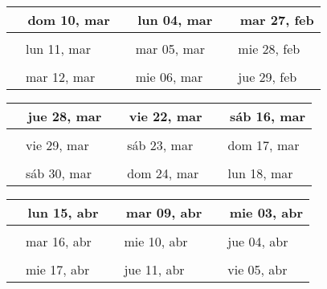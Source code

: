\documentclass[letterpaper,10pt]{article}
\begin{document}
\begin{tabular}{lll}
\\
{\ \ dom 10, mar\hspace{4.5cm}\vspace{2.25cm}} &{\ \ lun 04, mar\hspace{4.5cm}} &{\ \ mar 27, feb\hspace{4.5cm}}
\\ \hline \\
{\ \ lun 11, mar\vspace{2.25cm}} & {\ \ mar 05, mar} & {\ \ mie 28, feb}
\\ \hline \\
{\ \ mar 12, mar\vspace{2.25cm}} & {\ \ mie 06, mar} & {\ \ jue 29, feb}
\\
\end{tabular}\par
\begin{tabular}{lll}
\\
{\ \ jue 28, mar\hspace{4.5cm}\vspace{2.25cm}} &{\ \ vie 22, mar\hspace{4.5cm}} &{\ \ sáb 16, mar\hspace{4.5cm}}
\\ \hline \\
{\ \ vie 29, mar\vspace{2.25cm}} & {\ \ sáb 23, mar} & {\ \ dom 17, mar}
\\ \hline \\
{\ \ sáb 30, mar\vspace{2.25cm}} & {\ \ dom 24, mar} & {\ \ lun 18, mar}
\\
\end{tabular}\par
\begin{tabular}{lll}
\\
{\ \ lun 15, abr\hspace{4.5cm}\vspace{2.25cm}} &{\ \ mar 09, abr\hspace{4.5cm}} &{\ \ mie 03, abr\hspace{4.5cm}}
\\ \hline \\
{\ \ mar 16, abr\vspace{2.25cm}} & {\ \ mie 10, abr} & {\ \ jue 04, abr}
\\ \hline \\
{\ \ mie 17, abr\vspace{2.25cm}} & {\ \ jue 11, abr} & {\ \ vie 05, abr}
\\
\end{tabular}\par
\end{document}
